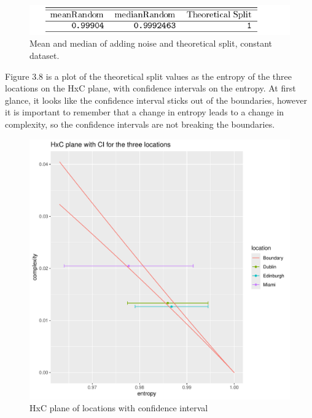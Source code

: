 \begin{figure}
    \centering
    \includegraphics[width=\textwidth,keepaspectratio]{../../Weather/random_vs_theoreticalSplitWhiteNoise.pdf}
    \caption{Mean and median of adding noise and theoretical split, constant dataset.}
\end{figure}

Figure 3.8 is a plot of the theoretical split values as the entropy of the three locations on the HxC plane, with confidence intervals on the entropy. At first glance, it looks like the confidence interval sticks out of the boundaries, however it is important to remember that a change in entropy leads to a change in complexity, so the confidence intervals are not breaking the boundaries. 

\begin{figure}
    \centering
    \includegraphics[width=\textwidth,keepaspectratio]{../../Weather/confidenceIntervalPlot.pdf}
    \caption{HxC plane of locations with confidence interval}
\end{figure}

